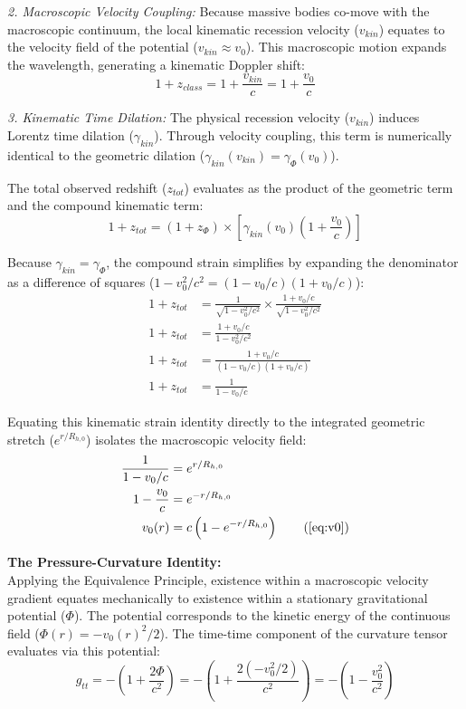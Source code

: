\textit{2. Macroscopic Velocity Coupling:} Because massive bodies co-move with the macroscopic continuum, the local kinematic recession velocity ($v_{kin}$) equates to the velocity field of the potential ($v_{kin} \approx v_0$). This macroscopic motion expands the wavelength, generating a kinematic Doppler shift: %
\begin{equation}
    1 + z_{class} = 1 + \frac{v_{kin}}{c} = 1 + \frac{v_0}{c}
\end{equation}

\textit{3. Kinematic Time Dilation:} The physical recession velocity ($v_{kin}$) induces Lorentz time dilation ($\gamma_{kin}$). Through velocity coupling, this term is numerically identical to the geometric dilation ($\gamma_{kin}(v_{kin}) = \gamma_{\Phi}(v_0)$). 

The total observed redshift ($z_{tot}$) evaluates as the product of the geometric term and the compound kinematic term:
\begin{equation}
    1 + z_{tot} = (1 + z_{\Phi}) \times \left[ \gamma_{kin}(v_0) \left(1 + \frac{v_0}{c}\right) \right]
\end{equation}

Because $\gamma_{kin} = \gamma_{\Phi}$, the compound strain simplifies by expanding the denominator as a difference of squares ($1-v_0^2/c^2 = (1-v_0/c)(1+v_0/c)$):
\begin{align}
    1+z_{tot} &= \frac{1}{\sqrt{1-v_0^2/c^2}} \times \frac{1+v_0/c}{\sqrt{1-v_0^2/c^2}} \\
    1+z_{tot} &= \frac{1+v_0/c}{1-v_0^2/c^2} \\
    1+z_{tot} &= \frac{1+v_0/c}{(1-v_0/c)(1+v_0/c)} \\
    1+z_{tot} &= \frac{1}{1 - v_0/c}
\end{align}

Equating this kinematic strain identity directly to the integrated geometric stretch ($e^{r/R_{h,0}}$) isolates the macroscopic velocity field:
\begin{align}
    \frac{1}{1-v_0/c} &= e^{r/R_{h,0}} \\
    1-\frac{v_0}{c} &= e^{-r/R_{h,0}} \\
    v_0(r) &= c\left(1 - e^{-r/R_{h,0}}\right) \tag{\ref{eq:v0}}
\end{align}

\vspace{0.2cm}
\textbf{The Pressure-Curvature Identity:} \\
Applying the Equivalence Principle, existence within a macroscopic velocity gradient equates mechanically to existence within a stationary gravitational potential ($\Phi$). The potential corresponds to the kinetic energy of the continuous field ($\Phi(r) = -v_0(r)^2/2$). The time-time component of the curvature tensor evaluates via this potential:
\begin{equation}
    g_{tt} = -\left( 1 + \frac{2\Phi}{c^2} \right) = -\left( 1 + \frac{2(-v_0^2/2)}{c^2} \right) = -\left( 1 - \frac{v_0^2}{c^2} \right)
\end{equation}

